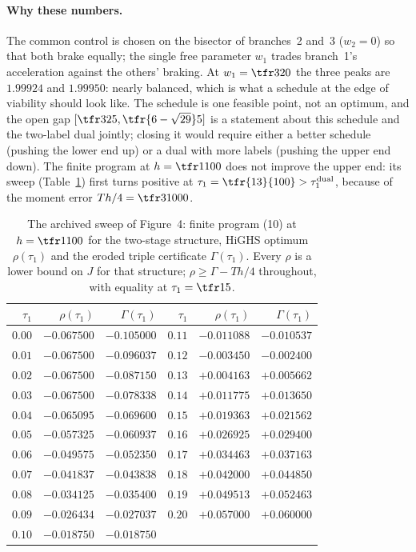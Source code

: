 \paragraph{Why these numbers.}
The common control is chosen on the bisector of branches~2 and~3 ($w_2=0$) so that both brake equally; the single free parameter $w_1$ trades branch~1's acceleration against the others' braking. At $w_1=\tfr3{20}$ the three peaks are $1.99924$ and $1.99950$: nearly balanced, which is what a schedule at the edge of viability should look like. The schedule is one feasible point, not an optimum, and the open gap $[\tfr3{25},\tfr{6-\sqrt{29}}5]$ is a statement about this schedule and the two-label dual jointly; closing it would require either a better schedule (pushing the lower end up) or a dual with more labels (pushing the upper end down). The finite program at $h=\tfr1{100}$ does not improve the upper end: its sweep (Table~\ref{tab:sweep}) first turns positive at $\tau_1=\tfr{13}{100}>\tau_1^{\mathrm{dual}}$, because of the moment error $Th/4=\tfr3{1000}$.

\begin{table}[h]
\centering\footnotesize
\caption{The archived sweep of Figure~4: finite program (10) at $h=\tfr1{100}$ for the two-stage structure, HiGHS optimum $\rho(\tau_1)$ and the eroded triple certificate $\Gamma(\tau_1)$. Every $\rho$ is a lower bound on $J$ for that structure; $\rho\ge\Gamma-Th/4$ throughout, with equality at $\tau_1=\tfr15$.}
\label{tab:sweep}
\begin{tabular}{@{}rrr@{\qquad}rrr@{}}
\toprule
$\tau_1$ & $\rho(\tau_1)$ & $\Gamma(\tau_1)$ & $\tau_1$ & $\rho(\tau_1)$ & $\Gamma(\tau_1)$\\
\midrule
$0.00$ & $-0.067500$ & $-0.105000$ & $0.11$ & $-0.011088$ & $-0.010537$\\
$0.01$ & $-0.067500$ & $-0.096037$ & $0.12$ & $-0.003450$ & $-0.002400$\\
$0.02$ & $-0.067500$ & $-0.087150$ & $0.13$ & $+0.004163$ & $+0.005662$\\
$0.03$ & $-0.067500$ & $-0.078338$ & $0.14$ & $+0.011775$ & $+0.013650$\\
$0.04$ & $-0.065095$ & $-0.069600$ & $0.15$ & $+0.019363$ & $+0.021562$\\
$0.05$ & $-0.057325$ & $-0.060937$ & $0.16$ & $+0.026925$ & $+0.029400$\\
$0.06$ & $-0.049575$ & $-0.052350$ & $0.17$ & $+0.034463$ & $+0.037163$\\
$0.07$ & $-0.041837$ & $-0.043838$ & $0.18$ & $+0.042000$ & $+0.044850$\\
$0.08$ & $-0.034125$ & $-0.035400$ & $0.19$ & $+0.049513$ & $+0.052463$\\
$0.09$ & $-0.026434$ & $-0.027037$ & $0.20$ & $+0.057000$ & $+0.060000$\\
$0.10$ & $-0.018750$ & $-0.018750$ & & &\\
\bottomrule
\end{tabular}
\end{table}

